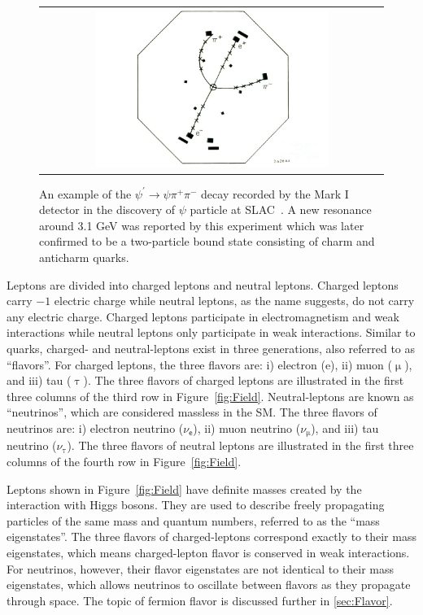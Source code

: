 \begin{figure}[tbh!]
 \begin{center}
 \begin{tabular}{c}
 \includegraphics[width=0.7\textwidth]{figures/Part1/Field/J}
 \end{tabular}
 \caption{An example of the $\psi^{\prime}\rightarrow\psi\pi^{+}\pi^{-}$ decay recorded by the Mark I detector in the discovery of $\psi$ particle at SLAC~\cite{SLAC-SP-017:1974ind}. A new resonance around 3.1 GeV was reported by this experiment which was later confirmed to be a two-particle bound state consisting of charm and anticharm quarks.}
 \label{fig:JPsi}
 \end{center}
\end{figure}

Leptons are divided into charged leptons and neutral leptons. Charged leptons carry $-1$ electric charge while neutral leptons, as the name suggests, do not carry any electric charge. Charged leptons participate in electromagnetism and weak interactions while neutral leptons only participate in weak interactions. Similar to quarks, charged- and neutral-leptons exist in three generations, also referred to as ``flavors''. For charged leptons, the three flavors are: i) electron (e), ii) muon ($\upmu$), and iii) tau ($\uptau$). The three flavors of charged leptons are illustrated in the first three columns of the third row in Figure~\ref{fig:Field}. Neutral-leptons are known as ``neutrinos'', which are considered massless in the \ac{SM}. The three flavors of neutrinos are: i) electron neutrino ($\nu_{\textsf{e}}$), ii) muon neutrino ($\nu_{\upmu}$), and iii) tau neutrino ($\nu_{\uptau}$). The three flavors of neutral leptons are illustrated in the first three columns of the fourth row in Figure~\ref{fig:Field}.

Leptons shown in Figure~\ref{fig:Field} have definite masses created by the interaction with Higgs bosons. They are used to describe freely propagating particles of the same mass and quantum numbers, referred to as the ``mass eigenstates''. The three flavors of charged-leptons correspond exactly to their mass eigenstates, which means charged-lepton flavor is conserved in weak interactions. For neutrinos, however, their flavor eigenstates are not identical to their mass eigenstates, which allows neutrinos to oscillate between flavors as they propagate through space. The topic of fermion flavor is discussed further in \autoref{sec:Flavor}. 

